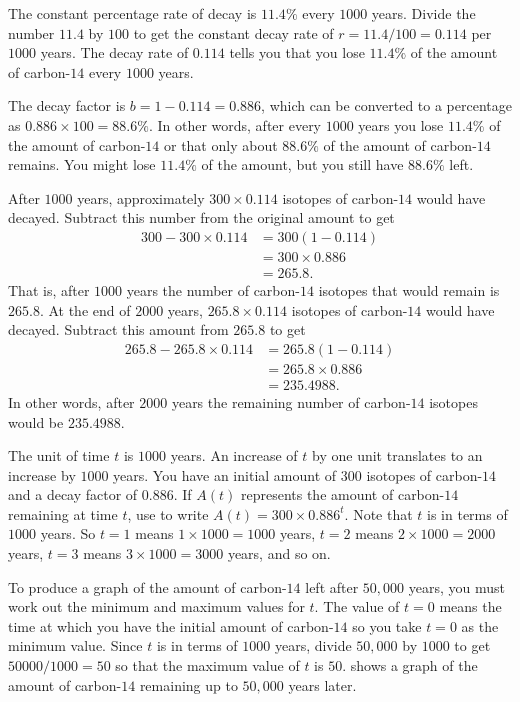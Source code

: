 \documentclass[a4paper,oneside,12pt]{article}
\begin{document}
\begin{solution}
The constant percentage rate of decay is $11.4\%$ every $1000$ years.
Divide the number $11.4$ by $100$ to get the constant decay rate of
$r = 11.4 / 100 = 0.114$ per $1000$ years.  The decay rate of $0.114$
tells you that you lose $11.4\%$ of the amount of carbon-$14$ every
$1000$ years.

The decay factor is $b = 1 - 0.114 = 0.886$, which can be converted to
a percentage as $0.886 \times 100 = 88.6\%$.  In other words, after
every $1000$ years you lose $11.4\%$ of the amount of carbon-$14$ or
that only about $88.6\%$ of the amount of carbon-$14$ remains.  You
might lose $11.4\%$ of the amount, but you still have $88.6\%$ left.

After $1000$ years, approximately $300 \times 0.114$ isotopes of
carbon-$14$ would have decayed.  Subtract this number from the
original amount to get
\begin{align*}
300 - 300 \times 0.114
&=
300 (1 - 0.114) \\[4pt]
&=
300 \times 0.886 \\[4pt]
&=
265.8.
\end{align*}
That is, after $1000$ years the number of carbon-$14$ isotopes that
would remain is $265.8$.  At the end of $2000$ years,
$265.8 \times 0.114$ isotopes of carbon-$14$ would have decayed.
Subtract this amount from $265.8$ to get
\begin{align*}
265.8 - 265.8 \times 0.114
&=
265.8 (1 - 0.114) \\[4pt]
&=
265.8 \times 0.886 \\[4pt]
&=
235.4988.
\end{align*}
In other words, after $2000$ years the remaining number of carbon-$14$
isotopes would be $235.4988$.

The unit of time $t$ is $1000$ years.  An increase of $t$ by one unit
translates to an increase by $1000$ years.  You have an initial amount
of $300$ isotopes of carbon-$14$ and a decay factor of $0.886$.  If
$A(t)$ represents the amount of carbon-$14$ remaining at time $t$, use
 to write $A(t) = 300 \times 0.886^t$.
Note that $t$ is in terms of $1000$ years.  So $t = 1$ means
$1 \times 1000 = 1000$ years, $t = 2$ means $2 \times 1000 = 2000$
years, $t = 3$ means $3 \times 1000 = 3000$ years, and so on.

To produce a graph of the amount of carbon-$14$ left after $50,000$
years, you must work out the minimum and maximum values for $t$.  The
value of $t = 0$ means the time at which you have the initial amount
of carbon-$14$ so you take $t = 0$ as the minimum value.  Since $t$ is
in terms of $1000$ years, divide $50,000$ by $1000$ to get
$50000 / 1000 = 50$ so that the maximum value of $t$ is $50$.
 shows a graph of the amount of carbon-$14$
remaining up to $50,000$ years later.
\end{solution}
\end{document}

